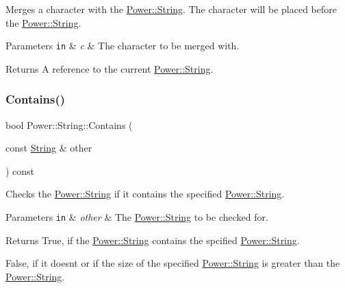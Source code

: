 Merges a character with the \hyperlink{class_power_1_1_string}{Power\+::\+String}. The character will be placed before the \hyperlink{class_power_1_1_string}{Power\+::\+String}. 


\begin{DoxyParams}[1]{Parameters}
\mbox{\tt in}  & {\em c} & The character to be merged with. \\
\hline
\end{DoxyParams}
\begin{DoxyReturn}{Returns}
A reference to the current \hyperlink{class_power_1_1_string}{Power\+::\+String}. 
\end{DoxyReturn}
\mbox{\label{class_power_1_1_string_aeaa32e499b49e67539953355b53609a8}} 
\subsubsection{\texorpdfstring{Contains()}{Contains()}\hspace{0.1cm}{\footnotesize\ttfamily [1/4]}}
{\footnotesize\ttfamily bool Power\+::\+String\+::\+Contains (\begin{DoxyParamCaption}\item[{const \hyperlink{class_power_1_1_string}{String} \&}]{other }\end{DoxyParamCaption}) const\hspace{0.3cm}{\ttfamily [inline]}}



Checks the \hyperlink{class_power_1_1_string}{Power\+::\+String} if it contains the specified \hyperlink{class_power_1_1_string}{Power\+::\+String}. 


\begin{DoxyParams}[1]{Parameters}
\mbox{\tt in}  & {\em other} & The \hyperlink{class_power_1_1_string}{Power\+::\+String} to be checked for. \\
\hline
\end{DoxyParams}
\begin{DoxyReturn}{Returns}
True, if the \hyperlink{class_power_1_1_string}{Power\+::\+String} contains the spcified \hyperlink{class_power_1_1_string}{Power\+::\+String}. 

False, if it doesn\textquotesingle{}t or if the size of the specified \hyperlink{class_power_1_1_string}{Power\+::\+String} is greater than the \hyperlink{class_power_1_1_string}{Power\+::\+String}. 
\end{DoxyReturn}
\mbox{\label{class_power_1_1_string_ad90a05c6e07bcd98684bd7c2aec7723f}} 
